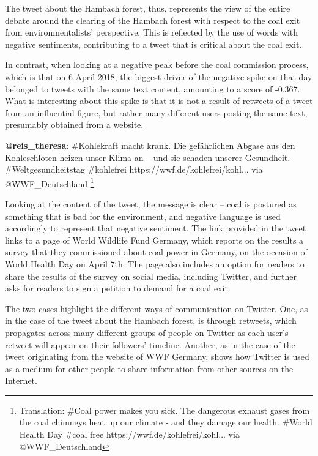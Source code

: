\documentclass[12pt,onecolumn,twoside]{layout}
\begin{document}
The tweet about the Hambach forest, thus, represents the view of the entire debate around the clearing of the Hambach forest with respect to the coal exit from environmentalists' perspective. This is reflected by the use of words with negative sentiments, contributing to a tweet that is critical about the coal exit. 

In contrast, when looking at a negative peak before the coal commission process, which is that on 6 April 2018, the biggest driver of the negative spike on that day belonged to tweets with the same text content, amounting to a score of -0.367. What is interesting about this spike is that it is not a result of retweets of a tweet from an influential figure, but rather many different users posting the same text, presumably obtained from a website. 

\begin{displayquote}
	\textbf{@reis\_theresa}: \#Kohlekraft macht krank. Die gefährlichen Abgase aus den Kohleschloten heizen unser Klima an – und sie schaden unserer Gesundheit. \#Weltgesundheitstag \#kohlefrei https://wwf.de/kohlefrei/kohl... via @WWF\_Deutschland
	\footnote{Translation: \#Coal power makes you sick. The dangerous exhaust gases from the coal chimneys heat up our climate - and they damage our health. \#World Health Day \#coal free https://wwf.de/kohlefrei/kohl... via @WWF\_Deutschland}
\end{displayquote}

Looking at the content of the tweet, the message is clear -- coal is postured as something that is bad for the environment, and negative language is used accordingly to represent that negative sentiment. The link provided in the tweet links to a page of World Wildlife Fund Germany, which reports on the results a survey that they commissioned about coal power in Germany, on the occasion of World Health Day on April 7th. The page also includes an option for readers to share the results of the survey on social media, including Twitter, and further asks for readers to sign a petition to demand for a coal exit. 

The two cases highlight the different ways of communication on Twitter. One, as in the case of the tweet about the Hambach forest, is through retweets, which propagates across many different groups of people on Twitter as each user's retweet will appear on their followers' timeline. Another, as in the case of the tweet originating from the website of WWF Germany, shows how Twitter is used as a medium for other people to share information from other sources on the Internet. 
\end{document}
